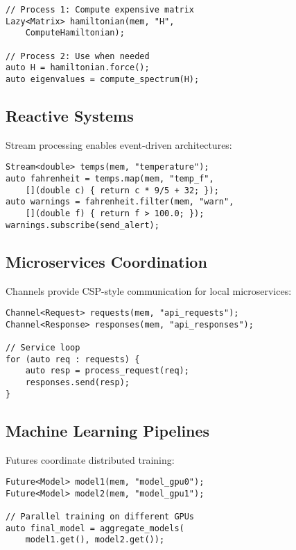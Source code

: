 \documentclass[10pt,conference]{IEEEtran}
\begin{document}
\begin{lstlisting}[caption={Parallel Simulation},label={lst:simulation}]
// Process 1: Compute expensive matrix
Lazy<Matrix> hamiltonian(mem, "H", 
    ComputeHamiltonian);

// Process 2: Use when needed
auto H = hamiltonian.force();
auto eigenvalues = compute_spectrum(H);
\end{lstlisting}

\subsection{Reactive Systems}

Stream processing enables event-driven architectures:

\begin{lstlisting}[caption={Sensor Processing Pipeline},label={lst:sensor}]
Stream<double> temps(mem, "temperature");
auto fahrenheit = temps.map(mem, "temp_f",
    [](double c) { return c * 9/5 + 32; });
auto warnings = fahrenheit.filter(mem, "warn",
    [](double f) { return f > 100.0; });
warnings.subscribe(send_alert);
\end{lstlisting}

\subsection{Microservices Coordination}

Channels provide CSP-style communication for local microservices:

\begin{lstlisting}[caption={Service Coordination},label={lst:microservice}]
Channel<Request> requests(mem, "api_requests");
Channel<Response> responses(mem, "api_responses");

// Service loop
for (auto req : requests) {
    auto resp = process_request(req);
    responses.send(resp);
}
\end{lstlisting}

\subsection{Machine Learning Pipelines}

Futures coordinate distributed training:

\begin{lstlisting}[caption={Distributed Training},label={lst:ml}]
Future<Model> model1(mem, "model_gpu0");
Future<Model> model2(mem, "model_gpu1");

// Parallel training on different GPUs
auto final_model = aggregate_models(
    model1.get(), model2.get());
\end{lstlisting}
\end{document}
